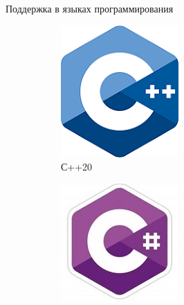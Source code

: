 \begin{frame}{Поддержка в языках программирования}
	\begin{figure}
	\centering
	\hfill
	\begin{subfigure}[b]{0.22\linewidth}
		\includegraphics[width=\linewidth]{images/cpp.png}
		\caption{С++20}
	\end{subfigure}
	\hfill
	\begin{subfigure}[b]{0.25\linewidth}
		\includegraphics[width=\linewidth]{images/csharp.jpg} 

\end{subfigure}
\end{figure}
\end{frame}
